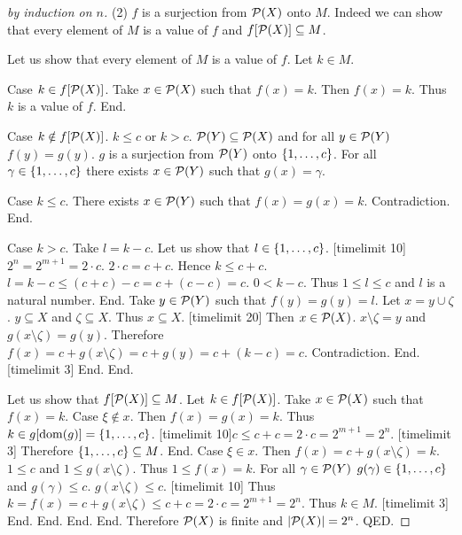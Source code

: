 \documentclass{article}
\begin{document}
\begin{forthel}
\begin{proof}[by induction on $n$]
    (2) $f$ is a surjection from ${\cal P}(X)$ onto $M$. 
    Indeed we can show that every element of $M$ is a value of $f$ and $f[{\cal P}(X)] \subseteq M$.
 
      Let us show that every element of $M$ is a value of $f$.
        Let $k \in M$.

        Case $k \in f[{\cal P}(X)]$. Take $x \in {\cal P}(X)$ such that $f(x) = k$. Then $f(x) = k$. Thus $k$ is a value of $f$. End.

        Case $k \notin f[{\cal P}(X)]$.
          $k \leq c$ or $k > c$. 
          ${\cal P}(Y) \subseteq {\cal P}(X)$ and for all $y \in {\cal P}(Y)$ $f(y) = g(y)$. $g$ is a surjection from ${\cal P}(Y)$ onto $\{1,\dots,c\}$.
          For all $\gamma \in \{1,\dots,c\}$ there exists $x \in {\cal P}(Y)$ such that $g(x) = \gamma$.
        
          Case $k \leq c$. There exists $x \in {\cal P}(Y)$ such that $f(x) = g(x) = k$. Contradiction. End.
        
          Case $k > c$. Take $l = k - c$.
            Let us show that $l \in \{1,\dots,c\}$. [timelimit 10]
              $2^{n} = 2^{m+1} = 2 \cdot c$. $2 \cdot c = c + c$. Hence $k \leq c + c$. 
              $l = k - c \leq (c + c) - c = c + (c - c) = c$. 
              $0 < k - c$. Thus $1 \leq l \leq c$ and $l$ is a natural number. End.
            Take $y \in {\cal P}(Y)$ such that $f(y) = g(y) = l$. Let $x = y \cup \zeta$. 
            $y \subseteq X$ and $\zeta \subseteq X$. Thus $x \subseteq X$.
            [timelimit 20]
            Then $x \in {\cal P}(X)$. $x \setminus \zeta = y$ and $g(x \setminus \zeta) = g(y)$. 
            Therefore $f(x) = c + g(x \setminus \zeta) = c + g(y) = c + (k - c) = c$. Contradiction. End. [timelimit 3]  
        End. 
      End.

      Let us show that $f[{\cal P}(X)] \subseteq M$.
        Let $k \in f[{\cal P}(X)]$. Take $x \in {\cal P}(X)$ such that $f(x) = k$.
        Case $\xi \notin x$. Then $f(x) = g(x) = k$. Thus $k \in g[\operatorname{dom}(g)] = \{1,\dots,c\}$. 
          [timelimit 10]$c \leq c + c = 2 \cdot c = 2^{m+1} = 2^{n}$. [timelimit 3] Therefore $\{1,\dots,c\} \subseteq M$. End.
        Case $\xi \in x$. Then $f(x) = c + g(x \setminus \zeta) = k$. $1 \leq c$ and $1 \leq g(x \setminus \zeta)$. Thus $1 \leq f(x) = k$.
          For all $\gamma \in {\cal P}(Y)$ $g(\gamma) \in \{1,\dots,c\}$ and $g(\gamma) \leq c$.
          $g(x \setminus \zeta) \leq c$. [timelimit 10] 
          Thus $k = f(x) = c + g(x \setminus \zeta) \leq c + c = 2 \cdot c = 2^{m+1}= 2^{n}$. Thus $k \in M$. [timelimit 3]
        End.
      End.
    End.
  End.
  Therefore ${\cal P}(X)$ is finite and $|{\cal P}(X)| = 2^{n}$.
QED.
\end{proof}
\end{forthel}
\end{document}
